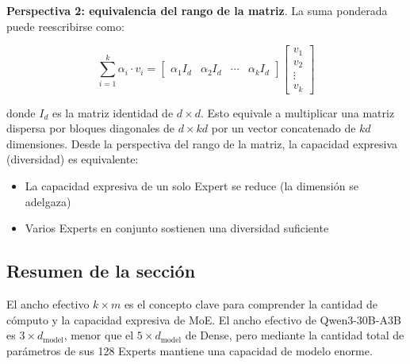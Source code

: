 \textbf{Perspectiva 2: equivalencia del rango de la matriz}. La suma ponderada puede reescribirse como:

$$
\sum_{i=1}^{k} \alpha_i \cdot v_i = \begin{bmatrix} \alpha_1 I_d & \alpha_2 I_d & \cdots & \alpha_k I_d \end{bmatrix} \begin{bmatrix} v_1 \\ v_2 \\ \vdots \\ v_k \end{bmatrix}
$$

donde $I_d$ es la matriz identidad de $d \times d$. Esto equivale a multiplicar una matriz dispersa por bloques diagonales de $d \times kd$ por un vector concatenado de $kd$ dimensiones. Desde la perspectiva del rango de la matriz, la capacidad expresiva (diversidad) es equivalente:
\begin{itemize}
  \item La capacidad expresiva de un solo Expert se reduce (la dimensión se adelgaza)
  \item Varios Experts en conjunto sostienen una diversidad suficiente
\end{itemize}

\subsection{Resumen de la sección}

El ancho efectivo $k \times m$ es el concepto clave para comprender la cantidad de cómputo y la capacidad expresiva de MoE. El ancho efectivo de Qwen3-30B-A3B es $3 \times d_{\text{model}}$, menor que el $5 \times d_{\text{model}}$ de Dense, pero mediante la cantidad total de parámetros de sus 128 Experts mantiene una capacidad de modelo enorme.

